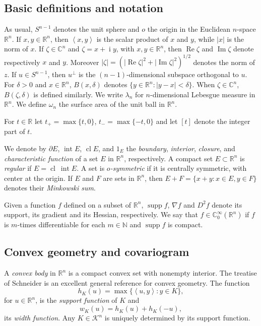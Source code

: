 \documentclass[a4paper]{amsart}
\theoremstyle{definition}
\numberwithin{equation}{section}
\begin{document}
\subsection{Basic definitions and notation}
As usual, ${S^{n-1}}$ denotes the unit sphere and  $o$ the
origin in the Euclidean $n$-space ${\mathbb{R}}^n$. If $x,y\in{\mathbb{R}}^n$, then $\left<x,y\right>$ is the scalar product of $x$ and $y$, while $|x|$ is the norm of $x$. 
If ${{\zeta}}\in{\mathbb{C}}^n$ and ${{\zeta}}=x+{\operatorname{i}} y$, with $x,y\in{\mathbb{R}}^n$, then ${\operatorname{Re}}{{\zeta}}$ and ${\operatorname{Im}} {{\zeta}}$ denote respectively $x$ and $y$. Moreover $|{{\zeta}}|=(|{\operatorname{Re}}{{\zeta}}|^2+|{\operatorname{Im}} {{\zeta}}|^2)^{1/2}$ denotes the norm of $z$. If $u\in{S^{n-1}}$, then $u^{\perp}$ is the $(n-1)$-dimensional subspace orthogonal to $u$. 
For ${{\delta}}>0$ and $x\in{\mathbb{R}}^n$, $B(x,{{\delta}})$ denotes $\{y\in{\mathbb{R}}^n : |y-x|<{{\delta}}\}$. When ${{\zeta}}\in{\mathbb{C}}^n$, $B({{\zeta}},{{\delta}})$ is defined similarly. We write ${{\lambda}}_n$ for $n$-dimensional Lebesgue measure in ${\mathbb{R}}^n$. We define $\omega_n$ the surface area of the unit ball in ${\mathbb{R}}^n$.

For $t\in{\mathbb{R}}$ let $t_+=\max\{t,0\}$, $t_-=\max\{-t,0\}$ and let $[t]$ denote the integer part of $t$.

We denote by $\partial E$,  ${{\operatorname{int}}} E$,  ${{\operatorname{cl}}} E$, and $1_E$ the {\it boundary}, {\it
interior}, \emph{closure}, and {\em characteristic function} of a set $E$ in ${\mathbb{R}}^n$, respectively. A compact set $E\subset{\mathbb{R}}^n$ is \emph{regular} if $E={{\operatorname{cl}}}\  {{\operatorname{int}}} E$. A set is {\it $o$-symmetric} if it is centrally symmetric, with center at the origin.
If $E$ and $F$ are sets in ${\mathbb{R}}^n$, then $E+F=\{x+y: x\in E, y\in F\}$ denotes their {\em Minkowski sum}.

Given a function $f$ defined on a subset of ${\mathbb{R}}^n$, ${{\operatorname{supp}}} f$, $\nabla f$ and $D^2 f$ denote its support, its gradient and its Hessian, respectively. We say that $f\in{\mathbb{C}}^\infty_0({\mathbb{R}}^n)$ if $f$ is $m$-times differentiable for each $m\in{\mathbb{N}}$ and ${{\operatorname{supp}}} f$ is compact.

\subsection{Convex geometry and covariogram}
A {\em convex body} in ${\mathbb{R}}^n$ is a compact convex set with nonempty interior. The treatise of
Schneider \cite{Sc} is an excellent general reference for convex geometry.
The function
$$h_K(u)=\max\{\left<u,y\right>: y\in K\},$$
for $u\in{\mathbb{R}}^n$, is the {\it support function} of $K$ and
$${{{w}}}_K(u)=h_K(u)+h_K(-u),$$
its {\it width function}.  Any $K \in {\mathcal K}^n$
is uniquely determined by its support function.
\end{document}
